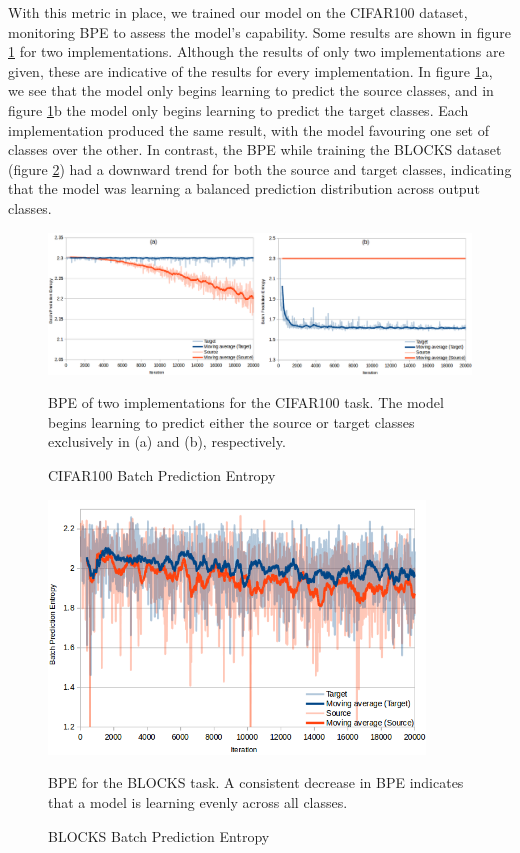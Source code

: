 \documentclass{report}
\begin{document}
With this metric in place, we trained our model on the CIFAR100 dataset, monitoring BPE to assess the model's capability. Some results are shown in figure \ref{fig:totalbatchpredgraph:1} for two implementations. Although the results of only two implementations are given, these are indicative of the results for every implementation. In figure \ref{fig:totalbatchpredgraph:1}a, we see that the model only begins learning to predict the source classes, and in figure \ref{fig:totalbatchpredgraph:1}b the model only begins learning to predict the target classes. Each implementation produced the same result, with the model favouring one set of classes over the other. In contrast, the BPE while training the BLOCKS dataset (figure \ref{fig:totalbatchpredgraphblocks:1}) had a downward trend for both the source and target classes, indicating that the model was learning a balanced prediction distribution across output classes. \par
\begin{figure}[h!]
	\centering
	\includegraphics[width=17.5cm]{totalbatchpredgraph}
	\caption{CIFAR100 Batch Prediction Entropy}
	BPE of two implementations for the CIFAR100 task. The model begins learning to predict either the source or target classes exclusively in (a) and (b), respectively.
	\label{fig:totalbatchpredgraph:1}
\end{figure}

\begin{figure}[h!]
	\centering
	\includegraphics[width=10cm]{totalbatchpredgraphblocks}
	\caption{BLOCKS Batch Prediction Entropy}
	BPE for the BLOCKS task. A consistent decrease in BPE indicates that a model is learning evenly across all classes.
	\label{fig:totalbatchpredgraphblocks:1}
\end{figure}
\end{document}
